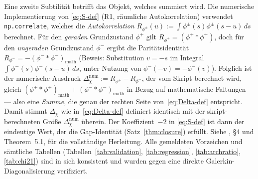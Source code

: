 \documentclass[a4paper,10pt,twocolumn]{article}
\theoremstyle{definition}
\theoremstyle{remark}
\newcommand{\chifn}{\chi}
\newcommand{\Deltachi}{\Delta_{\chifn}}
\begin{document}
Eine zweite Subtilität betrifft das Objekt, welches summiert wird. Die numerische
Implementierung von \eqref{eq:S-def} (R1, räumliche Autokorrelation)
verwendet \texttt{np.correlate}, welches die \emph{Autokorrelation}
$R_{\phi^\pm}(u):=\int\phi^\pm(s)\phi^\pm(s-u)\,ds$ berechnet.
Für den \emph{geraden} Grundzustand $\phi^+$ gilt
$R_{\phi^+}=(\phi^+{*}\phi^+)$, doch für den \emph{ungeraden} Grundzustand
$\phi^-$ ergibt die Paritätsidentität
$R_{\phi^-}=-(\phi^-{*}\phi^-)_{\mathrm{math}}$ (Beweis: Substitution $v=-s$ im
Integral $\int\phi^-(s)\phi^-(s-u)\,ds$, unter Nutzung von
$\phi^-(-v)=-\phi^-(v)$). Folglich ist der
numerische Ausdruck
$\Deltachi^{\mathrm{num}}:=R_{\phi^+}-R_{\phi^-}$, der vom Skript berechnet wird, gleich
$(\phi^+{*}\phi^+)_{\mathrm{math}}+(\phi^-{*}\phi^-)_{\mathrm{math}}$ in Bezug auf mathematische
Faltungen --- also eine \emph{Summe}, die genau der rechten Seite von~\eqref{eq:Delta-def}
entspricht. Damit stimmt $\Deltachi$ wie in~\eqref{eq:Delta-def} definiert identisch mit der
skript-berechneten Größe $\Deltachi^{\mathrm{num}}$ überein. Der Koeffizient~$-2$ in
\eqref{eq:S-def} ist dann der eindeutige Wert, der die Gap-Identität
(Satz~\ref{thm:closure}) erfüllt. Siehe
\cite{AnalyticKernelV2}, \S4 und Theorem~5.1, für die vollständige
Herleitung. Alle gemeldeten Vorzeichen und sämtliche Tabellen
(Tabellen~\ref{tab:validation}, \ref{tab:regression},
\ref{tab:archratio}, \ref{tab:chi21}) sind in sich konsistent
und wurden gegen eine direkte Galerkin-Diagonalisierung verifiziert.
\end{document}
